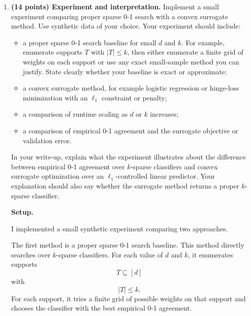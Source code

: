 \documentclass[11pt]{article}
\begin{document}
\begin{enumerate}
\begin{solutionbox}
        Hence
        \[
        \boxed{
        \text{If }\mathsf{NP}\ne\mathsf{RP},\text{ there is no efficient proper agnostic PAC learner}
        }
        \]
        \[
        \boxed{
        \text{for sparse linear classifiers when }k\text{ is part of the input.}
        }
        \]
    \end{solutionbox}
    \item \textbf{(14 points) Experiment and interpretation.}
    Implement a small experiment comparing proper sparse 0-1 search with a convex surrogate method. Use synthetic data of your choice.
    \newline
    Your experiment should include:
    \begin{itemize}
        \item a proper sparse 0-1 search baseline for small $d$ and $k$. For example, enumerate supports $T$ with $|T|\le k$, then either enumerate a finite grid of weights on each support or use any exact small-sample method you can justify. State clearly whether your baseline is exact or approximate;
        \item a convex surrogate method, for example logistic regression or hinge-loss minimization with an $\ell_1$ constraint or penalty;
        \item a comparison of runtime scaling as $d$ or $k$ increases;
        \item a comparison of empirical 0-1 agreement and the surrogate objective or validation error.
    \end{itemize}
    In your write-up, explain what the experiment illustrates about the difference between empirical 0-1 agreement over $k$-sparse classifiers and convex surrogate optimization over an $\ell_1$-controlled linear predictor. Your explanation should also say whether the surrogate method returns a proper $k$-sparse classifier.

    \begin{solutionbox}
        \textbf{Setup.}

        I implemented a small synthetic experiment comparing two approaches.

        The first method is a proper sparse 0-1 search baseline. This method directly searches
        over $k$-sparse classifiers. For each value of $d$ and $k$, it enumerates supports
        \[
        T\subseteq[d]
        \]
        with
        \[
        |T|\le k.
        \]
        For each support, it tries a finite grid of possible weights on that support and chooses
        the classifier with the best empirical 0-1 agreement.


\end{solutionbox}
\end{enumerate}
\end{document}
